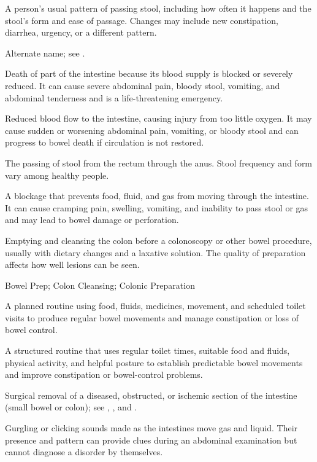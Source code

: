  A person’s usual pattern of passing stool, including how often it happens and the stool’s form and ease of passage. Changes may include new constipation, diarrhea, urgency, or a different pattern.

 Alternate name; see .

 Death of part of the intestine because its blood supply is blocked or severely reduced. It can cause severe abdominal pain, bloody stool, vomiting, and abdominal tenderness and is a life-threatening emergency.

 Reduced blood flow to the intestine, causing injury from too little oxygen. It may cause sudden or worsening abdominal pain, vomiting, or bloody stool and can progress to bowel death if circulation is not restored.

 The passing of stool from the rectum through the anus. Stool frequency and form vary among healthy people.

 A blockage that prevents food, fluid, and gas from moving through the intestine. It can cause cramping pain, swelling, vomiting, and inability to pass stool or gas and may lead to bowel damage or perforation.

 Emptying and cleansing the colon before a colonoscopy or other bowel procedure, usually with dietary changes and a laxative solution. The quality of preparation affects how well lesions can be seen.

\synonyms
Bowel Prep; Colon Cleansing; Colonic Preparation

 A planned routine using food, fluids, medicines, movement, and scheduled toilet visits to produce regular bowel movements and manage constipation or loss of bowel control.

 A structured routine that uses regular toilet times, suitable food and fluids, physical activity, and helpful posture to establish predictable bowel movements and improve constipation or bowel-control problems.

 Surgical removal of a diseased, obstructed, or ischemic section of the intestine (small bowel or colon); see , , and .

 Gurgling or clicking sounds made as the intestines move gas and liquid. Their presence and pattern can provide clues during an abdominal examination but cannot diagnose a disorder by themselves.

